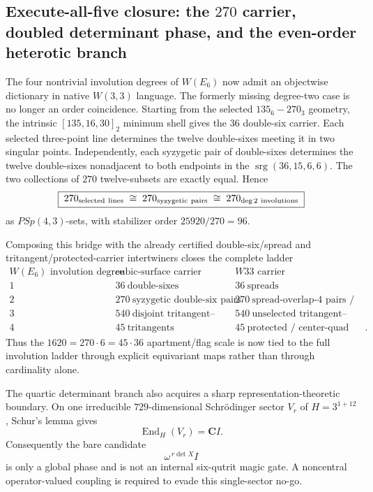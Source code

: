 \subsection{Execute-all-five closure: the $270$ carrier, doubled determinant phase, and the even-order heterotic branch}
\label{sec:20260917-execute-all5-crossrepo-closure}

The four nontrivial involution degrees of \(W(E_6)\) now admit an objectwise
dictionary in native \(W(3,3)\) language.  The formerly missing degree-two
case is no longer an order coincidence.  Starting from the selected
\(135_6\!-\!270_3\) geometry, the intrinsic \([135,16,30]_2\) minimum shell
gives the \(36\) double-six carrier.  Each selected three-point line determines
the twelve double-sixes meeting it in two singular points.  Independently,
each syzygetic pair of double-sixes determines the twelve double-sixes
nonadjacent to both endpoints in the \(\operatorname{srg}(36,15,6,6)\).
The two collections of \(270\) twelve-subsets are exactly equal.  Hence
\[
 \boxed{\;270_{\rm selected\ lines}
   \;\cong\;270_{\rm syzygetic\ pairs}
   \;\cong\;270_{\deg 2\ {\rm involutions}}\;}
\]
as \(PSp(4,3)\)-sets, with stabilizer order \(25920/270=96\).

Composing this bridge with the already certified double-six/spread and
tritangent/protected-carrier intertwiners closes the complete ladder
\[
\begin{array}{c|c|c}
\text{\(W(E_6)\) involution degree} & \text{cubic-surface carrier} &
\text{\(W33\) carrier}\\ \hline
1 & 36\ \text{double-sixes} & 36\ \text{spreads}\\
2 & 270\ \text{syzygetic double-six pairs} &
270\ \text{spread-overlap-4 pairs / selected lines}\\
3 & 540\ \text{disjoint tritangent--double-six flags} &
540\ \text{unselected tritangent--spread flags}\\
4 & 45\ \text{tritangents} &
45\ \text{protected / center-quad carriers}.
\end{array}
\]
Thus the \(1620=270\cdot6=45\cdot36\) apartment/flag scale is now tied to the
full involution ladder through explicit equivariant maps rather than through
cardinality alone.

The quartic determinant branch also acquires a sharp representation-theoretic
boundary.  On one irreducible \(729\)-dimensional Schrödinger sector
\(V_r\) of \(H=3^{1+12}\), Schur's lemma gives
\[
 \operatorname{End}_{H}(V_r)=\mathbf C I.
\]
Consequently the bare candidate
\[
 \omega^{\,r\det X} I
\]
is only a global phase and is not an internal six-qutrit magic gate.  A
noncentral operator-valued coupling is required to evade this single-sector
no-go.

